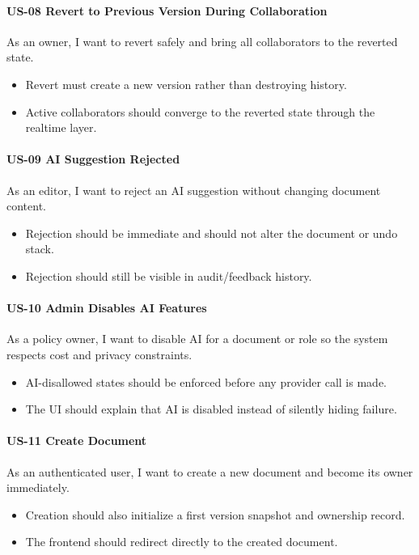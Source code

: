 \paragraph{US-08 Revert to Previous Version During Collaboration} As an owner, I want to revert safely and
bring all collaborators to the reverted state.
\begin{itemize}
  \item Revert must create a new version rather than destroying history.
  \item Active collaborators should converge to the reverted state through the realtime layer.
\end{itemize}

\paragraph{US-09 AI Suggestion Rejected} As an editor, I want to reject an AI suggestion without changing
document content.
\begin{itemize}
  \item Rejection should be immediate and should not alter the document or undo stack.
  \item Rejection should still be visible in audit/feedback history.
\end{itemize}

\paragraph{US-10 Admin Disables AI Features} As a policy owner, I want to disable AI for a document or role
so the system respects cost and privacy constraints.
\begin{itemize}
  \item AI-disallowed states should be enforced before any provider call is made.
  \item The UI should explain that AI is disabled instead of silently hiding failure.
\end{itemize}

\paragraph{US-11 Create Document} As an authenticated user, I want to create a new document and become its
owner immediately.
\begin{itemize}
  \item Creation should also initialize a first version snapshot and ownership record.
  \item The frontend should redirect directly to the created document.
\end{itemize}

